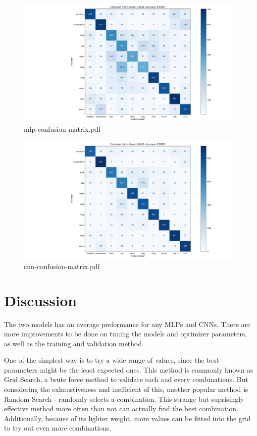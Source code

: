 \documentclass{report}
\begin{document}
\begin{figure}[ht]
    \center
    \includegraphics[scale=0.385]{../output/mlp-confusion-matrix.pdf}
    \caption{mlp-confusion-matrix.pdf}
\end{figure}

\begin{figure}[ht]
    \center
    \includegraphics[scale=0.385]{../output/cnn-confusion-matrix.pdf}
    \caption{cnn-confusion-matrix.pdf}
\end{figure}

\section{Discussion}
The two models has an average preformance for any MLPs and CNNs. There are more improvements to be done 
on tuning the models and optimizer parameters, as well as the training and validation method. 

One of the simplest way is to try a wide range of values, since the best parameters might be the least 
expected ones. This method is commonly known as Grid Search, a brute force method to validate each and 
every combinations. But considering the exhaustiveness and inefficient of this, another popular method is 
Random Search - randomly selects a combination. This strange but suprisingly effective method more often 
than not can actually find the best combination. Additionally, because of its lighter weight, more values
can be fitted into the grid to try out even more combinations.
\end{document}
